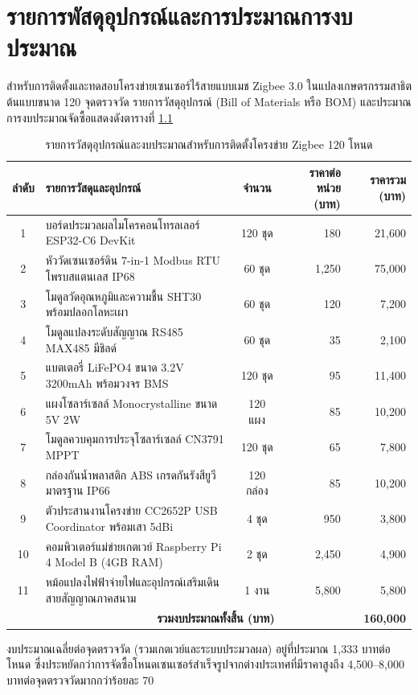 \chapter{รายการพัสดุอุปกรณ์และการประมาณการงบประมาณ}
\label{app:bom_budget}

สำหรับการติดตั้งและทดสอบโครงข่ายเซนเซอร์ไร้สายแบบเมช Zigbee 3.0 ในแปลงเกษตรกรรมสาธิตต้นแบบขนาด 120 จุดตรวจวัด รายการวัสดุอุปกรณ์ (Bill of Materials หรือ BOM) และประมาณการงบประมาณจัดซื้อแสดงดังตารางที่ \ref{tab:bom_120_nodes}

\begin{table}[H]
\caption{รายการวัสดุอุปกรณ์และงบประมาณสำหรับการติดตั้งโครงข่าย Zigbee 120 โหนด}
\label{tab:bom_120_nodes}
\centering
\small
\begin{tabularx}{\textwidth}{c >{\raggedright\arraybackslash}X c r r}
\toprule
\textbf{ลำดับ} & \textbf{รายการวัสดุและอุปกรณ์} & \textbf{จำนวน} & \textbf{ราคาต่อหน่วย (บาท)} & \textbf{ราคารวม (บาท)} \\
\midrule
1 & บอร์ดประมวลผลไมโครคอนโทรลเลอร์ ESP32-C6 DevKit & 120 ชุด & 180 & 21,600 \\
2 & หัววัดเซนเซอร์ดิน 7-in-1 Modbus RTU โพรบสแตนเลส IP68 & 60 ชุด & 1,250 & 75,000 \\
3 & โมดูลวัดอุณหภูมิและความชื้น SHT30 พร้อมปลอกโลหะเผา & 60 ชุด & 120 & 7,200 \\
4 & โมดูลแปลงระดับสัญญาณ RS485 MAX485 มีชิลด์ & 60 ชุด & 35 & 2,100 \\
5 & แบตเตอรี่ LiFePO4 ขนาด 3.2V 3200mAh พร้อมวงจร BMS & 120 ชุด & 95 & 11,400 \\
6 & แผงโซลาร์เซลล์ Monocrystalline ขนาด 5V 2W & 120 แผง & 85 & 10,200 \\
7 & โมดูลควบคุมการประจุโซลาร์เซลล์ CN3791 MPPT & 120 ชุด & 65 & 7,800 \\
8 & กล่องกันน้ำพลาสติก ABS เกรดกันรังสียูวี มาตรฐาน IP66 & 120 กล่อง & 85 & 10,200 \\
9 & ตัวประสานงานโครงข่าย CC2652P USB Coordinator พร้อมเสา 5dBi & 4 ชุด & 950 & 3,800 \\
10 & คอมพิวเตอร์แม่ข่ายเกตเวย์ Raspberry Pi 4 Model B (4GB RAM) & 2 ชุด & 2,450 & 4,900 \\
11 & หม้อแปลงไฟฟ้าจ่ายไฟและอุปกรณ์เสริมเดินสายสัญญาณภาคสนาม & 1 งาน & 5,800 & 5,800 \\
\midrule
\multicolumn{3}{r}{\textbf{รวมงบประมาณทั้งสิ้น (บาท)}} & & \textbf{160,000} \\
\bottomrule
\end{tabularx}
\end{table}

งบประมาณเฉลี่ยต่อจุดตรวจวัด (รวมเกตเวย์และระบบประมวลผล) อยู่ที่ประมาณ 1,333 บาทต่อโหนด ซึ่งประหยัดกว่าการจัดซื้อโหนดเซนเซอร์สำเร็จรูปจากต่างประเทศที่มีราคาสูงถึง 4,500--8,000 บาทต่อจุดตรวจวัดมากกว่าร้อยละ 70

\clearpage
